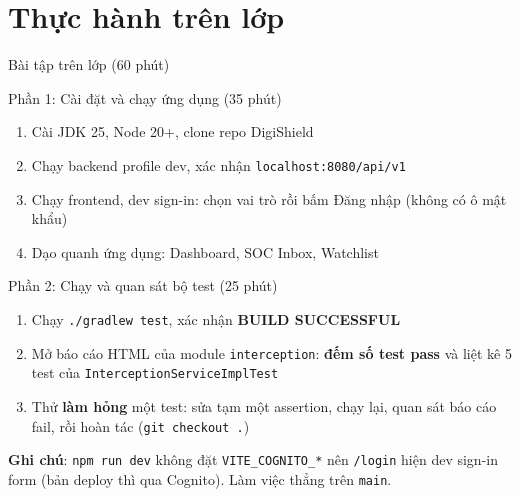 \documentclass[aspectratio=169,12pt]{beamer}
\begin{document}
\section{Thực hành trên lớp}

\begin{frame}{Bài tập trên lớp (60 phút)}
  \begin{block}{Phần 1: Cài đặt và chạy ứng dụng (35 phút)}
    \begin{enumerate}
      \item Cài JDK 25, Node 20+, clone repo DigiShield
      \item Chạy backend profile dev, xác nhận \texttt{localhost:8080/api/v1}
      \item Chạy frontend, dev sign-in: chọn vai trò rồi bấm Đăng nhập
            (không có ô mật khẩu)
      \item Dạo quanh ứng dụng: Dashboard, SOC Inbox, Watchlist
    \end{enumerate}
  \end{block}

  \begin{block}{Phần 2: Chạy và quan sát bộ test (25 phút)}
    \begin{enumerate}
      \item Chạy \texttt{./gradlew test}, xác nhận \textbf{BUILD SUCCESSFUL}
      \item Mở báo cáo HTML của module \texttt{interception}: \textbf{đếm số
            test pass} và liệt kê 5 test của \texttt{InterceptionServiceImplTest}
      \item Thử \textbf{làm hỏng} một test: sửa tạm một assertion, chạy lại,
            quan sát báo cáo fail, rồi hoàn tác (\texttt{git checkout .})
    \end{enumerate}
  \end{block}

  {\scriptsize \textbf{Ghi chú}: \texttt{npm run dev} không đặt
  \texttt{VITE\_COGNITO\_*} nên \texttt{/login} hiện dev sign-in form
  (bản deploy thì qua Cognito). Làm việc thẳng trên \texttt{main}.\par}
\end{frame}
\end{document}
